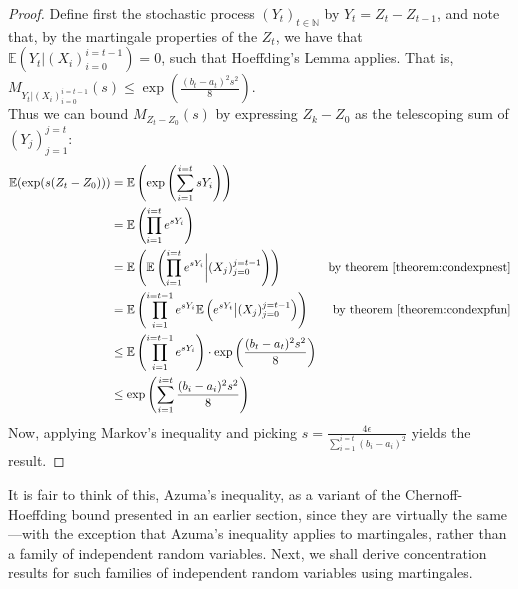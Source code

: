 	\begin{proof}
		Define first the stochastic process $(Y_t)_{t\in\mathbb{N}}$ by $Y_t=Z_t-Z_{t-1}$,
		and note that, by the martingale properties of the $Z_t$, we have that $\mathbb{E}
		(Y_t | (X_i)_{i=0}^{i=t-1}) = 0$, such that Hoeffding's Lemma applies. That is,
		$M_{Y_t | (X_i)_{i=0}^{i=t-1}}(s) \leq \exp \left(\frac{(b_t-a_t)^2s^2}{8}\right)$.
		\\
		Thus we can bound $M_{Z_t-Z_0}(s)$ by expressing $Z_k - Z_0$ as the telescoping sum
		of $(Y_j)_{j=1}^{j=t}$:
		\begin{align*}
			\mathbb{E}(\exp(s(Z_t-Z_0)))
			&= \mathbb{E}\left(\exp\left(\sum_{i=1}^{i=t} s Y_i\right)\right) \\
			&= \mathbb{E}\left(\prod_{i=1}^{i=t}e^{s Y_i}\right) \\
			&= \mathbb{E}\left(
				\mathbb{E}\left(\prod_{i=1}^{i=t}e^{sY_i}\bigg|(X_j)_{j=0}^{j=t-1}
				\right)\right) & \text{by theorem \ref{theorem:condexpnest}}\\
			&= \mathbb{E}\left(\prod_{i=1}^{i=t-1}e^{sY_i}
				\mathbb{E}\left(e^{sY_t}\big|(X_j)_{j=0}^{j=t-1}
				\right)\right) & \text{by theorem \ref{theorem:condexpfun}}\\
			&\leq \mathbb{E}\left(\prod_{i=1}^{i=t-1}e^{sY_i}
				\right) \cdot \exp\left(\frac{(b_t - a_t)^2s^2}{8}\right) \\
			&\leq \exp\left(\sum_{i=1}^{i=t}\frac{(b_i-a_i)^2s^2}{8}\right)
		\end{align*}
		Now, applying Markov's inequality and picking 
		$s = \frac{4 \epsilon}{\sum_{i=1}^{i=t} (b_i - a_i)^2 }$ yields the result.
	\end{proof}

	It is fair to think of this, Azuma's inequality, as a variant of the Chernoff-Hoeffding 
	bound presented in an earlier section, since they are virtually the same---with the 
	exception that Azuma's inequality applies to martingales, rather than a family of 
	independent random variables. Next, we shall derive concentration results for such 
	families of independent random variables using martingales.

